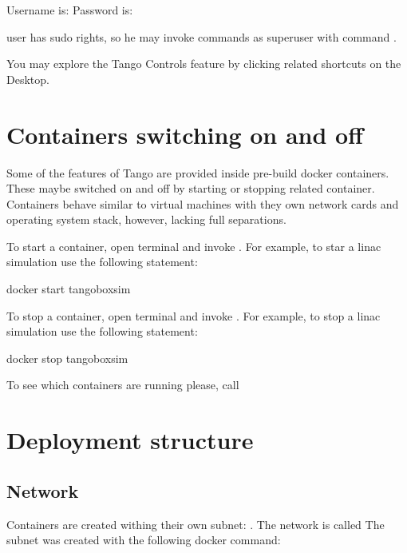 \documentclass[letterpaper,10pt,english]{sphinxmanual}
\begin{document}
Username is: 
Password is: 

 user has sudo rights, so he may invoke commands as superuser with command .

You may explore the Tango Controls feature by clicking related shortcuts on the Desktop.


\chapter{Containers switching on and off}
\label{\detokenize{index:containers-switching-on-and-off}}\label{\detokenize{index:container-switch-on-off}}
Some of the features of Tango are provided inside pre-build docker containers.
These maybe switched on and off by starting or stopping related container.
Containers behave similar to virtual machines with they own network cards and operating system stack,
however, lacking full separations.

To start a container, open terminal and invoke . For example, to star
a linac simulation use the following statement:

\begin{sphinxVerbatim}[commandchars=\\\{\}]
docker start tangobox\PYGZhy{}sim
\end{sphinxVerbatim}

To stop a container, open terminal and invoke . For example, to stop
a linac simulation use the following statement:

\begin{sphinxVerbatim}[commandchars=\\\{\}]
docker stop tangobox\PYGZhy{}sim
\end{sphinxVerbatim}

To see which containers are running please, call 


\chapter{Deployment structure}
\label{\detokenize{index:deployment-structure}}

\section{Network}
\label{\detokenize{index:network}}
Containers are created withing their own subnet: . The network is called 
The subnet was created with the following docker command:
\end{document}
